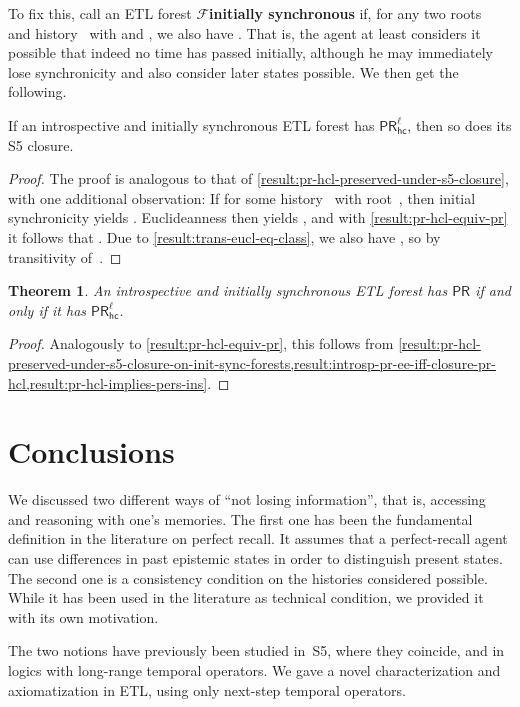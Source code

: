 \documentclass{article}
\newcommand{\PR}{\ensuremath{\mathsf{PR}}\xspace}
\newcommand{\PRhcl}{\ensuremath{\mathsf{PR_{hc}^\ell}}\xspace}
\def\dfn{\textbf}
\def\dfnless{\dfn} \def\F{\ensuremath{\mathcal{F}}\xspace}
\newcommand{\tiff}{if and only if\xspace}
\newcounter{#1}
\newtheorem{theorem}{Theorem}[section]
\begin{document}
To fix this, call an ETL forest \F \dfnless{initially synchronous} if,
for any two roots~ and history~ with  and ,
we also have .
That is, the agent at least considers it possible that indeed no time has passed initially,
although he may immediately lose synchronicity and also consider later states possible.
We then get the following.
\begin{lemma}
  \label{result:pr-hcl-preserved-under-s5-closure-on-init-sync-forests}
  If an introspective and initially synchronous ETL forest has \PRhcl, then so does its S5 closure.
\end{lemma}
\begin{proof}
  The proof is analogous to that of \cref{result:pr-hcl-preserved-under-s5-closure},
  with one additional observation:
  If  for some history~ with root~,
  then initial synchronicity yields .
  Euclideanness then yields ,
  and with \cref{result:pr-hcl-equiv-pr} it follows that .
  Due to \cref{result:trans-eucl-eq-class}, we also have ,
  so  by transitivity of~.
\end{proof}

\begin{theorem}
  An introspective and initially synchronous ETL forest has \PR \tiff it has \PRhcl.
\end{theorem}
\begin{proof}
  Analogously to \cref{result:pr-hcl-equiv-pr}, this follows from
  \cref{result:pr-hcl-preserved-under-s5-closure-on-init-sync-forests,result:introsp-pr-ee-iff-closure-pr-hcl,result:pr-hcl-implies-pers-ins}.
\end{proof}

\section{Conclusions}
\label{sec:conclusions}

We discussed two different ways of ``not losing information'', that is,
accessing and reasoning with one's memories.
The first one has been the fundamental definition in the literature on perfect recall.
It assumes that a perfect-recall agent can use differences in past epistemic states
in order to distinguish present states.
The second one is a consistency condition on the histories considered possible.
While it has been used in the literature as technical condition,
we provided it with its own motivation.

The two notions have previously been studied in~S5, where they coincide,
and in logics with long-range temporal operators.
We gave a novel characterization and axiomatization in ETL,
using only next-step temporal operators.
\end{document}
